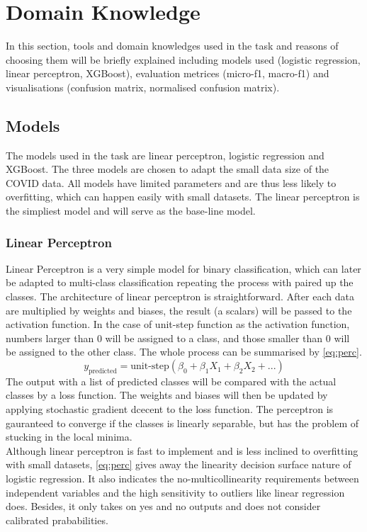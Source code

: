 \documentclass[10pt, a4paper, twocolumn]{article} %
\begin{document}
\section{Domain Knowledge}\label{sec:domain_knowledge}
In this section, tools and domain knowledges used in the task and reasons of choosing them  will be 
briefly explained including models used (logistic regression, linear perceptron, XGBoost), evaluation metrices 
(micro-f1, macro-f1) and visualisations (confusion matrix, normalised confusion matrix).\\
\subsection{Models}
The models used in the task are linear perceptron, logistic regression and XGBoost. The three models are chosen to adapt 
the small data size of the COVID data. All models have limited parameters and are thus less likely to overfitting, which 
can happen easily with small datasets. The linear perceptron is the simpliest model and will serve as the base-line model. 
\subsubsection{Linear Perceptron}
Linear Perceptron\citep{Sagar}\citep{Ali} is a very simple model for binary classification, which can later be adapted to multi-class classification 
repeating the process with paired up the classes. The architecture of linear perceptron is straightforward. After 
each data are multiplied by weights and biases, the result (a scalars) will be passed to the activation function. In the case of 
unit-step function as the activation function, numbers larger than 0 will be assigned to a class, and those smaller than 0 will be 
assigned to the other class. The whole process can be summarised by \autoref{eq:perc}.
\begin{equation}\label{eq:perc}
	y_\text{predicted} = \text{unit-step}\left(\beta_0 + \beta_1X_1+ \beta_2X_2+ ...\right)
\end{equation}
The output with a list of predicted classes will be compared with the actual classes by a loss function. 
The weights and biases will then be updated by applying stochastic gradient dcecent\citep{Abhijit} to the loss function. The perceptron is 
gauranteed to converge if the classes is linearly separable, but has the problem of stucking in the local minima.\\[10pt]
Although linear perceptron is fast to implement and is less inclined to overfitting with small datasets, \autoref{eq:perc} gives away 
the linearity decision surface nature of logistic regression. It also indicates the no-multicollinearity requirements between 
independent variables and the high sensitivity to outliers like linear regression does. Besides, it only takes on yes and no outputs 
and does not consider calibrated prababilities.
\end{document}
